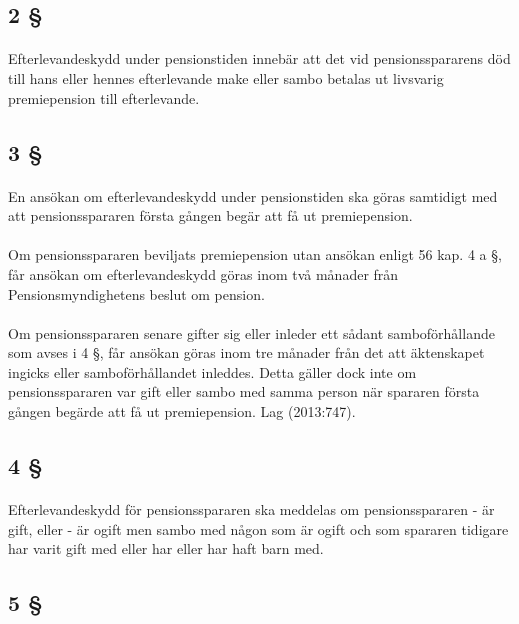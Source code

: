 \documentclass[a4paper,notitlepage,openany,10pt]{book}
\begin{document}
\subsection*{2 §}
\paragraph*{}
Efterlevandeskydd under pensionstiden innebär att det vid pensionsspararens död till hans eller hennes efterlevande make eller sambo betalas ut livsvarig premiepension till efterlevande.
\subsection*{3 §}
\paragraph*{}
En ansökan om efterlevandeskydd under pensionstiden ska göras samtidigt med att pensionsspararen första gången begär att få ut premiepension.
\paragraph*{}
Om pensionsspararen beviljats premiepension utan ansökan enligt 56 kap. 4 a §, får ansökan om efterlevandeskydd göras inom två månader från Pensionsmyndighetens beslut om pension.
\paragraph*{}
Om pensionsspararen senare gifter sig eller inleder ett sådant samboförhållande som avses i 4 §, får ansökan göras inom tre månader från det att äktenskapet ingicks eller samboförhållandet inleddes. Detta gäller dock inte om pensionsspararen var gift eller sambo med samma person när spararen första gången begärde att få ut premiepension.
Lag (2013:747).
\subsection*{4 §}
\paragraph*{}
Efterlevandeskydd för pensionsspararen ska meddelas om pensionsspararen
\newline - är gift, eller
\newline - är ogift men sambo med någon som är ogift och som spararen tidigare har varit gift med eller har eller har haft barn med.
\subsection*{5 §}
\end{document}
